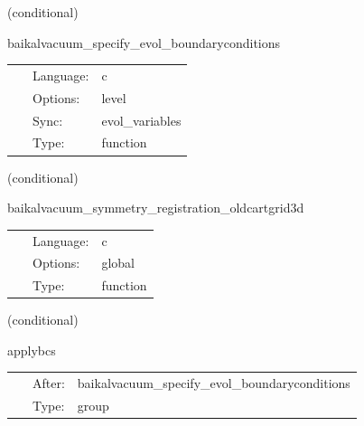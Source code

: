 \vspace{5mm}

   (conditional) 

\hspace{5mm} baikalvacuum\_specify\_evol\_boundaryconditions 

\hspace{5mm}{\it register boundary conditions and perform amr+interprocessor synchronization } 


\hspace{5mm}

 \begin{tabular*}{160mm}{cll} 
~ & Language:  & c \\ 
~ & Options:  & level \\ 
~ & Sync:  & evol\_variables \\ 
~ & Type:  & function \\ 
\end{tabular*} 


\vspace{5mm}

   (conditional) 

\hspace{5mm} baikalvacuum\_symmetry\_registration\_oldcartgrid3d 

\hspace{5mm}{\it register symmetries, the cartgrid3d way. } 


\hspace{5mm}

 \begin{tabular*}{160mm}{cll} 
~ & Language:  & c \\ 
~ & Options:  & global \\ 
~ & Type:  & function \\ 
\end{tabular*} 


\vspace{5mm}

   (conditional) 

\hspace{5mm} applybcs 

\hspace{5mm}{\it apply registered boundary conditions } 


\hspace{5mm}

 \begin{tabular*}{160mm}{cll} 
~ & After:  & baikalvacuum\_specify\_evol\_boundaryconditions \\ 
~ & Type:  & group \\ 
\end{tabular*} 



